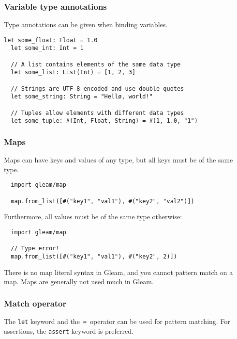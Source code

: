 \vs
\subsubsection*{\rmfamily Variable type annotations}

Type annotations can be given when binding variables.

\begin{lstlisting}[belowskip=-\baselineskip]
  let some_float: Float = 1.0
  let some_int: Int = 1  

  // A list contains elements of the same data type
  let some_list: List(Int) = [1, 2, 3]

  // Strings are UTF-8 encoded and use double quotes 
  let some_string: String = "Hellø, world!"

  // Tuples allow elements with different data types
  let some_tuple: #(Int, Float, String) = #(1, 1.0, "1")
\end{lstlisting}

\vs
\subsubsection*{\rmfamily Maps}

Maps can have keys and values of any type, but all keys must be of 
the same type.

\begin{lstlisting}
  import gleam/map

  map.from_list([#("key1", "val1"), #("key2", "val2")])
\end{lstlisting}

\vs
Furthermore, all values must be of the same type otherwise:

\begin{lstlisting}
  import gleam/map

  // Type error!
  map.from_list([#("key1", "val1"), #("key2", 2)])  
\end{lstlisting}

There is no map literal syntax in Gleam, and you cannot pattern match on a map.
Maps are generally not used much in Gleam.

\vs
\subsubsection*{\rmfamily Match operator}

The \lstinline[language=Gleam, basicstyle=\small]!let! keyword and the
\,\lstinline[language=Gleam, basicstyle=\large]!=!\, operator can be used for
pattern matching. For assertions, the 
\lstinline[language=Gleam, basicstyle=\small]!assert! keyword is preferred.

